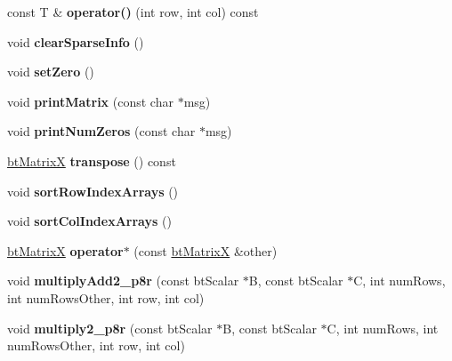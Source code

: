 \begin{DoxyCompactItemize}
const T \& {\bfseries operator()} (int row, int col) const
\item 
\mbox{\label{structbtMatrixX_a0df163f737bf35a15119b02bebf01818}} 
void {\bfseries clear\+Sparse\+Info} ()
\item 
\mbox{\label{structbtMatrixX_a0bdf52f3712fe250237e792f1b0bcb9c}} 
void {\bfseries set\+Zero} ()
\item 
\mbox{\label{structbtMatrixX_aaef07244038148837ee8cf4ba132c22f}} 
void {\bfseries print\+Matrix} (const char $\ast$msg)
\item 
\mbox{\label{structbtMatrixX_aab5e0fb89759d2902b0e6d5b4eab88a4}} 
void {\bfseries print\+Num\+Zeros} (const char $\ast$msg)
\item 
\mbox{\label{structbtMatrixX_a2e980e331ffba26f028fb6b92df43317}} 
\hyperlink{structbtMatrixX}{bt\+MatrixX} {\bfseries transpose} () const
\item 
\mbox{\label{structbtMatrixX_a002ff38f37d306cb8f464d4893a05f2b}} 
void {\bfseries sort\+Row\+Index\+Arrays} ()
\item 
\mbox{\label{structbtMatrixX_ae95551ad50490b23b106819d6bca1c5c}} 
void {\bfseries sort\+Col\+Index\+Arrays} ()
\item 
\mbox{\label{structbtMatrixX_a34b8eb6349a9c4376e61844e1e0f9eeb}} 
\hyperlink{structbtMatrixX}{bt\+MatrixX} {\bfseries operator$\ast$} (const \hyperlink{structbtMatrixX}{bt\+MatrixX} \&other)
\item 
\mbox{\label{structbtMatrixX_ac1fa934d92fd3c7844e58febb00efb0b}} 
void {\bfseries multiply\+Add2\+\_\+p8r} (const bt\+Scalar $\ast$B, const bt\+Scalar $\ast$C, int num\+Rows, int num\+Rows\+Other, int row, int col)
\item 
\mbox{\label{structbtMatrixX_aae657343aaac366b1d255fde09b2c8c5}} 
void {\bfseries multiply2\+\_\+p8r} (const bt\+Scalar $\ast$B, const bt\+Scalar $\ast$C, int num\+Rows, int num\+Rows\+Other, int row, int col)
\end{DoxyCompactItemize}

